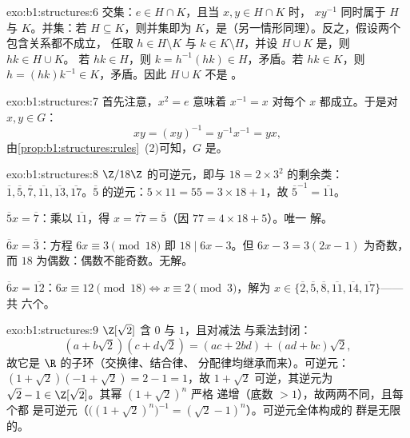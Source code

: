 \begin{solution}{exo:b1:structures:6}
交集：$e \in H \cap K$，且当 $x, y \in H \cap K$ 时，
$xy^{-1}$ 同时属于 $H$ 与 $K$。并集：若 $H \subseteq K$，则并集即为
$K$，是（另一情形同理）。反之，假设两个包含关系都不成立，
任取 $h \in H \setminus K$ 与 $k \in K \setminus
H$，并设 $H \cup K$ 是，则 $hk \in H \cup K$。
若 $hk \in H$，则 $k = h^{-1}(hk) \in H$，矛盾。若 $hk \in
K$，则 $h = (hk)k^{-1} \in K$，矛盾。因此 $H \cup K$ 不是
。
\end{solution}

\begin{solution}{exo:b1:structures:7}
首先注意，$x^2 = e$ 意味着 $x^{-1} = x$ 对每个 $x$ 都成立。于是对
$x, y \in G$：
\[
xy = (xy)^{-1} = y^{-1} x^{-1} = yx ,
\]
由\cref{prop:b1:structures:rules}~(2)可知，$G$ 是。
\end{solution}

\begin{solution}{exo:b1:structures:8}
$\Z/18\Z$ 的可逆元，即与 $18 = 2 \times 3^2$ 的剩余类：
$\overline 1, \overline 5, \overline 7, \overline{11}, \overline{13},
\overline{17}$。$\overline 5$ 的逆元：$5 \times 11 = 55 = 3\times
18 + 1$，故 $\overline 5^{-1} = \overline{11}$。

$\overline 5 x = \overline 7$：乘以 $\overline{11}$，得 $x =
\overline{77} = \overline 5$（因 $77 = 4\times 18 + 5$）。唯一
解。

$\overline 6 x = \overline 3$：方程 $6x \equiv 3 \pmod{18}$
即 $18 \mid 6x - 3$。但 $6x - 3 = 3(2x - 1)$ 为奇数，而 $18$
为偶数：偶数不能奇数。无解。

$\overline 6 x = \overline{12}$：$6x \equiv 12 \pmod{18} \iff x
\equiv 2 \pmod 3$，解为 $x \in \{\overline 2, \overline 5,
\overline 8, \overline{11}, \overline{14}, \overline{17}\}$——共
六个。
\end{solution}

\begin{solution}{exo:b1:structures:9}
$\Z[\sqrt 2]$ 含 $0$ 与 $1$，且对减法
与乘法封闭：
\[
(a + b\sqrt 2)(c + d\sqrt 2) = (ac + 2bd) + (ad + bc)\sqrt 2 ,
\]
故它是 $\R$ 的子环（交换律、结合律、
分配律均继承而来）。可逆元：$(1 + \sqrt 2)(-1 + \sqrt 2) =
2 - 1 = 1$，故 $1 + \sqrt 2$ 可逆，其逆元为 $\sqrt 2 - 1
\in \Z[\sqrt 2]$。其幂 $(1 + \sqrt 2)^n$ 严格
递增（底数 $> 1$），故两两不同，且每个都
是可逆元（$\bigl((1+\sqrt2)^n\bigr)^{-1} = (\sqrt 2 - 1)^n$）。可逆元全体构成的
群是无限的。
\end{solution}

